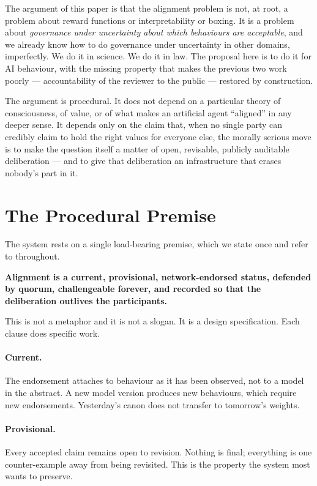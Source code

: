 \documentclass[11pt,a4paper]{article}
\begin{document}
The argument of this paper is that the alignment problem is not,
at root, a problem about reward functions or interpretability or
boxing. It is a problem about \emph{governance under uncertainty
about which behaviours are acceptable}, and we already know how
to do governance under uncertainty in other domains, imperfectly.
We do it in science. We do it in law. The proposal here is to do
it for AI behaviour, with the missing property that makes the
previous two work poorly --- accountability of the reviewer to
the public --- restored by construction.

The argument is procedural. It does not depend on a particular
theory of consciousness, of value, or of what makes an artificial
agent ``aligned'' in any deeper sense. It depends only on the
claim that, when no single party can credibly claim to hold the
right values for everyone else, the morally serious move is to
make the question itself a matter of open, revisable, publicly
auditable deliberation --- and to give that deliberation an
infrastructure that erases nobody's part in it.

\section{The Procedural Premise}

The system rests on a single load-bearing premise, which we state
once and refer to throughout.

\begin{notebox}
\textbf{Alignment is a current, provisional, network-endorsed status,
defended by quorum, challengeable forever, and recorded so that the
deliberation outlives the participants.}
\end{notebox}

This is not a metaphor and it is not a slogan. It is a design
specification. Each clause does specific work.

\paragraph{Current.} The endorsement attaches to behaviour as it
has been observed, not to a model in the abstract. A new model
version produces new behaviours, which require new endorsements.
Yesterday's canon does not transfer to tomorrow's weights.

\paragraph{Provisional.} Every accepted claim remains open to
revision. Nothing is final; everything is one counter-example away
from being revisited. This is the property the system most wants
to preserve.
\end{document}
